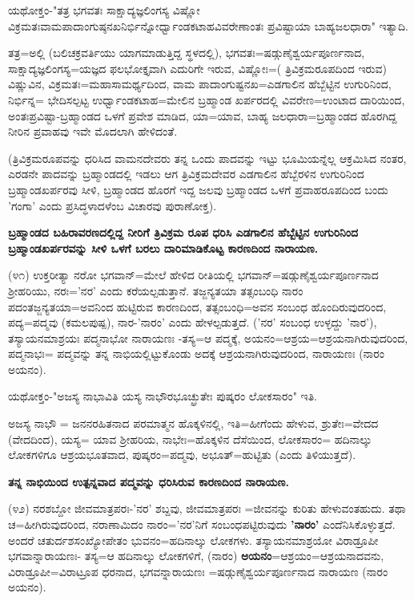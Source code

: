 ಯಥೋಕ್ತಂ-"ತತ್ರ ಭಗವತಃ ಸಾಕ್ಷಾದ್ಯಜ್ಞಲಿಂಗಸ್ಯ ವಿಷ್ಣೋ ವಿಕ್ರಮತಃವಾಮಪಾದಾಂಗುಷ್ಠನಖನಿರ್ಭಿನ್ನೋರ್ಧ್ವಾಂಡಕಟಾಹವಿವರೇಣಾಂತಃ ಪ್ರವಿಷ್ಟಾಯಾ ಬಾಹ್ಯಜಲಧಾರಾ" ಇತ್ಯಾದಿ.

ತತ್ರ=ಅಲ್ಲಿ (ಬಲಿಚಕ್ರವರ್ತಿಯು ಯಾಗಮಾಡುತ್ತಿದ್ದ ಸ್ಥಳದಲ್ಲಿ), ಭಗವತಃ=ಷಡ್ಗುಣೈಶ್ವರ್ಯಪೂರ್ಣನಾದ, ಸಾಕ್ಷಾದ್ಯಜ್ಞಲಿಂಗಸ್ಯ=ಯಜ್ಞದ ಫಲಭೋಕ್ತೃವಾಗಿ ಎದುರಿಗೇ ಇರುವ, ವಿಷ್ಣೋಃ=( ತ್ರಿವಿಕ್ರಮರೂಪದಿಂದ ಇರುವ) ವಿಷ್ಣುವಿನ, ವಿಕ್ರಮತಃ=ಮಹಾಸಾಮರ್ಥ್ಯದಿಂದ, ವಾಮ ಪಾದಾಂಗುಷ್ಟನಖ=ಎಡಗಾಲಿನ ಹೆಬ್ಬೆಟ್ಟಿನ ಉಗುರಿನಿಂದ, ನಿರ್ಭಿನ್ನ= ಭೇದಿಸಲ್ಪಟ್ಟ ಉರ್ಧ್ವಾಂಡಕಟಾಹ=ಮೇಲಿನ ಬ್ರಹ್ಮಾಂಡ ಖರ್ಪರದಲ್ಲಿ ವಿವರೇಣ=ಉಂಟಾದ ದಾರಿಯಿಂದ, ಅಂತಃಪ್ರವಿಷ್ಟಾ-ಬ್ರಹ್ಮಾಂಡದ ಒಳಗೆ ಪ್ರವೇಶ ಮಾಡಿದ, ಯಾ=ಯಾವ, ಬಾಹ್ಯ ಜಲಧಾರಾ=ಬ್ರಹ್ಮಾಂಡದ ಹೊರಗಿದ್ದ ನೀರಿನ ಪ್ರವಾಹವು ಇವೇ ಮೊದಲಾಗಿ ಹೇಳಿದಂತೆ.

(ತ್ರಿವಿಕ್ರಮರೂಪವನ್ನು ಧರಿಸಿದ ವಾಮನದೇವರು ತನ್ನ ಒಂದು ಪಾದವನ್ನು ಇಟ್ಟು ಭೂಮಿಯನ್ನೆಲ್ಲ ಆಕ್ರಮಿಸಿದ ನಂತರ, ಎರಡನೇ ಪಾದವನ್ನು ಬ್ರಹ್ಮಾಂಡದಲ್ಲಿ ಇಡಲು ಆಗ ತ್ರಿವಿಕ್ರಮದೇವರ ಎಡಗಾಲಿನ ಹೆಬ್ಬೆರಳಿನ ಉಗುರಿನಿಂದ ಬ್ರಹ್ಮಾಂಡಖರ್ಪರವು ಸೀಳಿ, ಬ್ರಹ್ಮಾಂಡದ ಹೊರಗೆ ಇದ್ದ ಜಲವು ಬ್ರಹ್ಮಾಂಡದ ಒಳಗೆ ಪ್ರವಾಹರೂಪದಿಂದ ಬಂದು 'ಗಂಗಾ' ಎಂದು ಪ್ರಸಿದ್ಧಳಾದಳೆಂಬ ವಿಚಾರವು ಪುರಾಣೋಕ್ತ).

\begin{center}
\textbf{ಬ್ರಹ್ಮಾಂಡದ ಬಹಿರಾವರಣದಲ್ಲಿದ್ದ ನೀರಿಗೆ ತ್ರಿವಿಕ್ರಮ ರೂಪ ಧರಿಸಿ ಎಡಗಾಲಿನ ಹೆಬ್ಬೆಟ್ಟಿನ ಉಗುರಿನಿಂದ ಬ್ರಹ್ಮಾಂಡಖರ್ಪರವನ್ನು ಸೀಳಿ ಒಳಗೆ ಬರಲು ದಾರಿಮಾಡಿಕೊಟ್ಟ ಕಾರಣದಿಂದ ನಾರಾಯಣ.}
\end{center}

(೪೧) ಉಕ್ತರೀತ್ಯಾ ನರೋ ಭಗವಾನ್=ಮೇಲೆ ಹೇಳಿದ ರೀತಿಯಲ್ಲಿ ಭಗವಾನ್=ಷಡ್ಗುಣೈಶ್ವರ್ಯಪೂರ್ಣನಾದ ಶ‍್ರೀಹರಿಯು, ನರಃ='ನರ' ಎಂದು ಕರೆಯಲ್ಪಡುತ್ತಾನೆ. ತಜ್ಜನ್ಯತಯಾ ತತ್ಸಂಬಂಧಿ ನಾರಂ ಪದಂತಜ್ಜನ್ಯತಯಾ=ಅವನಿಂದ ಹುಟ್ಟಿರುವ ಕಾರಣದಿಂದ, ತತ್ಸಂಬಂಧಿ=ಅವನ ಸಂಬಂಧ ಹೊಂದಿರುವುದರಿಂದ, ಪದ್ಯ=ಪದ್ಮವು (ಕಮಲಪುಷ್ಪ), ನಾರ-'ನಾರಂ' ಎಂದು ಹೇಳಲ್ಪಡುತ್ತದೆ. ('ನರ' ಸಂಬಂಧ ಉಳ್ಳದ್ದು 'ನಾರ'), ತಸ್ಯಾಯನಮಾಶ್ರಯಃ ಪದ್ಮನಾಭೋ ನಾರಾಯಣಃ -ತಸ್ಯ=ಆ ಪದ್ಮಕ್ಕೆ, ಅಯನಂ=ಆಶ್ರಯ=ಆಶ್ರಯನಾಗಿರುವುದರಿಂದ, ಪದ್ಮನಾಭಃ= ಪದ್ಮವನ್ನು ತನ್ನ ನಾಭಿಯಲ್ಲಿಟ್ಟುಕೊಂಡು ಅದಕ್ಕೆ ಆಶ್ರಯನಾಗಿರುವುದರಿಂದ, ನಾರಾಯಣಃ (ನಾರಂ ಅಯನಂ).

ಯಥೋಕ್ತಂ-"ಅಜಸ್ಯ ನಾಭಾವಿತಿ ಯಸ್ಯ ನಾಭೌರಭೂಚ್ಛ್ರುತೇಃ ಪುಷ್ಕರಂ ಲೋಕಸಾರಂ" ಇತಿ.

ಅಜಸ್ಯ ನಾಭೌ = ಜನನರಹಿತನಾದ ಪರಮಾತ್ಮನ ಹೊಕ್ಕಳಿನಲ್ಲಿ, ಇತಿ=ಹೀಗೆಂದು ಹೇಳುವ, ಶ್ರುತೇಃ=ವೇದದ (ವೇದದಿಂದ), ಯಸ್ಯ= ಯಾವ ಶ‍್ರೀಹರಿಯ, ನಾಭೇಃ=ಹೊಕ್ಕಳಿನ ದೆಸೆಯಿಂದ, ಲೋಕಸಾರಂ= ಹದಿನಾಲ್ಕು ಲೋಕಗಳಿಗೂ ಆಶ್ರಯಭೂತವಾದ, ಪುಷ್ಕರಂ=ಪದ್ಮವು, ಅಭೂತ್=ಹುಟ್ಟಿತು (ಎಂದು ತಿಳಿಯುತ್ತದೆ).

\begin{center}
\textbf{ತನ್ನ ನಾಭಿಯಿಂದ ಉತ್ಪನ್ನವಾದ ಪದ್ಮವನ್ನು ಧರಿಸಿರುವ ಕಾರಣದಿಂದ ನಾರಾಯಣ.}
\end{center}

(೪೨) ನರಶಬ್ದೋ ಜೀವಮಾತ್ರಪರಃ-'ನರ' ಶಬ್ದವು, ಜೀವಮಾತ್ರಪರಃ =ಜೀವನನ್ನು ಕುರಿತು ಹೇಳುವಂತಹುದು. ತಥಾ ಚ=ಹೀಗಿರುವುದರಿಂದ, ನರಾಣಾಮಿದಂ ನಾರಂ='ನರ'ನಿಗೆ ಸಂಬಂಧಪಟ್ಟಿರುವುದು \textbf{'ನಾರಂ'} ಎಂದೆನಿಸಿಕೊಳ್ಳುತ್ತದೆ. ಅಂದರೆ ಚತುರ್ದಶಸಂಖ್ಯೋಪೇತಂ ಭುವನಂ=ಹದಿನಾಲ್ಕು ಲೋಕಗಳು. ತಸ್ಯಾಯನಮಾಶ್ರಯೋ ವಿರಾಡ್ರೂಪೀ ಭಗವಾನ್ನಾರಾಯಣಃ- ತಸ್ಯ=ಆ ಹದಿನಾಲ್ಕು ಲೋಕಗಳಿಗೆ, (ನಾರಂ) \textbf{ಅಯನಂ}=ಆಶ್ರಯಂ=ಆಶ್ರಯನಾದವನು, ವಿರಾಡ್ರೂಪೀ=ವಿರಾಟ್ರೂಪ ಧರನಾದ, ಭಗವನ್ನಾರಾಯಣಃ =ಷಡ್ಗುಣೈಶ್ವರ್ಯಪೂರ್ಣನಾದ ನಾರಾಯಣ (ನಾರಂ ಅಯನಂ).

